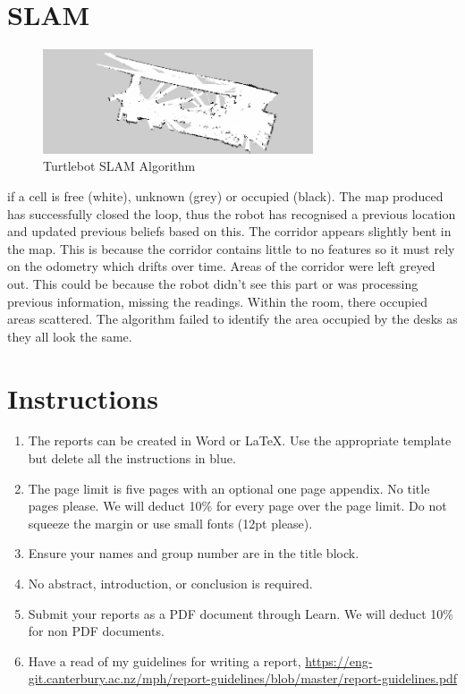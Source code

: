\documentclass[a4paper,12pt]{article}
\newcommand{\comment}[1]{\emph{\color{blue}#1}}
\begin{document}
\section{SLAM}
\begin{figure}[h]
\includegraphics[width=8cm]{slam}
\centering
\caption{Turtlebot SLAM Algorithm}
\end{figure}
if a cell is free (white), unknown (grey) or occupied (black). The map produced has successfully closed the loop, thus the robot has recognised a previous location and updated previous beliefs based on this. The corridor appears slightly bent in the map. This is because the corridor contains little to no features so it must rely on the odometry which drifts over time. Areas of the corridor were left greyed out. This could be because the robot didn’t see this part or was processing previous information, missing the readings. Within the room, there occupied areas scattered. The algorithm failed to identify the area occupied by the desks as they all look the same. 




\color{blue}
\section*{Instructions}

\begin{enumerate}
\item The reports can be created in Word or \LaTeX.  Use the
  appropriate template but delete all the instructions in blue.  

\item The page limit is five pages with an optional one page appendix.
  No title pages please.  We will deduct 10\% for every page over the
  page limit.  Do not squeeze the margin or use small fonts (12pt
  please).

\item Ensure your names and group number are in the title block.

\item No abstract, introduction, or conclusion is required.
  
\item Submit your reports as a PDF document through Learn.  We will
  deduct 10\% for non PDF documents.

\item Have a read of my guidelines for writing a report,
  \url{https://eng-git.canterbury.ac.nz/mph/report-guidelines/blob/master/report-guidelines.pdf}
  
\end{enumerate}
\end{document}
